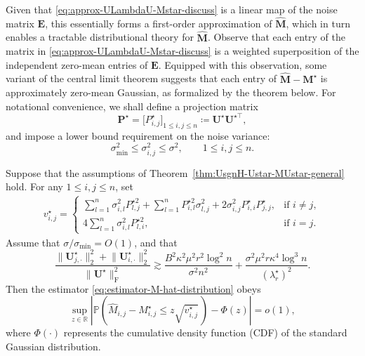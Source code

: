 Given that \eqref{eq:approx-ULambdaU-Mstar-discuss} is a linear map of the noise matrix $\bm{E}$, 
this essentially forms a first-order approximation of $\widehat{\bm{M}}$,
which in turn enables a tractable distributional theory for $\widehat{\bm{M}}$. 
Observe that each entry of the matrix in \eqref{eq:approx-ULambdaU-Mstar-discuss} 
is a weighted superposition of the independent zero-mean entries of $\bm{E}$.   
Equipped with this observation, some variant of the central limit theorem
suggests that each entry of $\widehat{\bm{M}} - \bm{M}^{\star}$ is approximately zero-mean Gaussian,
as formalized by the theorem below. For notational convenience, we shall define a projection matrix
	\begin{equation}
		\bm{P}^{\star}= \big[ P_{i,j}^{\star} \big]_{1\leq i,j\leq n} \coloneqq \bm{U}^{\star}\bm{U}^{\star\top},
		\label{eq:defn-P-UU-T}
	\end{equation}	
and impose a lower bound requirement on the noise variance: 
%
\begin{equation}
	 \sigma_{\min}^2 \leq \sigma_{i,j}^2 \leq \sigma^2, \qquad 1\leq i,j\leq n. 
	 \label{eq:sigma-min-definition}
\end{equation}
%
\begin{theorem}
\label{thm:matrix-distribution-complete}
%
Suppose that the assumptions of Theorem~\ref{thm:UsgnH-Ustar-MUstar-general} hold. For any $1\leq i,j\leq n$, set
%
\begin{align}
	v_{i,j}^{\star}=
		\begin{cases}
			\sum_{l=1}^{n}\sigma_{i,l}^{2}P^{\star 2}_{l,j}+\sum_{l=1}^{n}P^{\star 2}_{i,l}\sigma_{l,j}^{2}+2\sigma_{i,j}^{2}P^{\star}_{i,i}P^{\star}_{j,j}, & \text{if }i\neq j,\\
			4\sum_{l=1}^{n}\sigma_{i,l}^{2}P^{\star 2}_{l,i}, & \text{if }i=j. 
		\end{cases}
	\label{eq:variance-formula-Mij-lem}
\end{align}
%
Assume that $\sigma/\sigma_{\min}=O(1)$, and that
%
\begin{equation}
	\frac{\big\|\bm{U}_{j,\cdot}^{\star}\big\|_{2}^{2}+\big\|\bm{U}_{i,\cdot}^{\star}\big\|_{2}^{2}}{\big\|\bm{U}^{\star}\big\|_{\mathrm{F}}^{2}}
	\gtrsim \frac{B^{2}\kappa^{2}\mu^{2}r^{2}\log^{2}n}{\sigma^{2}n^{2}}+\frac{\sigma^{2}\mu^{2}r\kappa^{4}\log^{3}n}{(\lambda_{r}^{\star})^{2}}.
	\label{eq:Ui-Uj-condition-thm-distribution-1}
\end{equation}
%
Then the estimator \eqref{eq:estimator-M-hat-distribution} obeys
%
\[
	\sup_{z\in\mathbb{R}}\left|\mathbb{P}\left(\widehat{M}_{i,j}-M_{i,j}^{\star}\leq z\sqrt{v_{i,j}^{\star}}\,\right)-\Phi(z)\right|=o(1) ,
\]
where $\Phi(\cdot)$ represents the cumulative density function (CDF) of the standard Gaussian distribution.
% 
\end{theorem}
